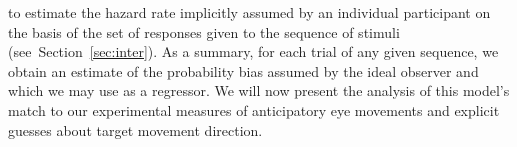 \documentclass[12pt,english]{article}%
\newcommand{\seeFig}[1]{Figure~\ref{fig:#1}}
\newcommand{\seeSec}[1]{Section~\ref{sec:#1}}
\newcommand{\AM}[1]{\textbf{\textcolor{blue}{[AM: #1]}}}
\begin{document}
to estimate the hazard rate implicitly assumed by an individual participant
on the basis of the set of responses given to the  sequence of stimuli
(see~\seeSec{inter}).
%
As a summary, for each trial of any given sequence,
we obtain an estimate of the probability bias assumed by the ideal observer
and which we may use as a regressor.
We will now present the analysis of this model's match 
to our experimental measures of anticipatory eye movements and 
explicit guesses about target movement direction.
\end{document}

